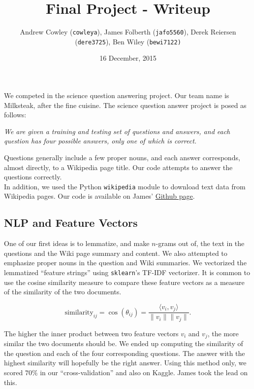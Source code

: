 \documentclass{article}
\title{Final Project - Writeup}
\date{\small 16 December, 2015}
\author{\normalsize Andrew Cowley (\texttt{cowleya}), James Folberth (\texttt{jafo5560}), Derek Reiersen (\texttt{dere3725}), Ben Wiley (\texttt{bewi7122)}}
\theoremstyle{mystuff}
\theoremstyle{myexample}
\theoremstyle{named}
\begin{document}
\maketitle

We competed in the science question answering project.  Our team name is Milksteak, after the fine cuisine. The science question answer project is posed as follows: 

\begin{center}
    \parbox{0.65\linewidth}{%
        \textit{We are given a training and testing set of questions and answers, and each question has four possible answers, only one of which is correct.}
    }
\end{center}

Questions generally include a few proper nouns, and each answer corresponds, almost directly, to a Wikipedia page title.  Our code attempts to answer the questions correctly. \\

In addition, we used the Python \texttt{wikipedia} module to download text data from Wikipedia pages.  Our code is available on James' \href{https://github.com/jamesfolberth/ml_project}{Github page}.\\

\subsection{NLP and Feature Vectors}
\label{ssec:nlp}
One of our first ideas is to lemmatize, and make $n$-grams out of, the text in the questions and the Wiki page summary and content.  We also attempted to emphasize proper nouns in the question and Wiki summaries.  We vectorized the lemmatized ``feature strings'' using \texttt{sklearn}'s TF-IDF vectorizer.  It is common to use the cosine similarity measure to compare these feature vectors as a measure of the similarity of the two documents.

\[ \text{similarity}_{ij} = \cos(\theta_{ij}) = \dfrac{\langle v_i, v_j\rangle}{\|v_i\|\|v_j\|}. \] 

\noindent The higher the inner product between two feature vectors $v_i$ and $v_j$, the more similar the two documents should be.  We ended up computing the similarity of the question and each of the four corresponding questions.  The answer with the highest similarity will hopefully be the right answer.  Using this method only, we scored $70\%$ in our ``cross-validation'' and also on Kaggle.  James took the lead on this.\\
\end{document}
